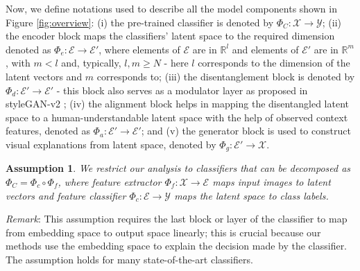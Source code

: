 \documentclass{article}
\newcommand{\ftcom}[2][]{\todo[author=FT, #1]{#2}}
\newtheorem{asu}{Assumption}
\begin{document}
Now, we define notations used to describe all the model components shown in Figure \ref{fig:overview}: (i) the pre-trained classifier is denoted by $\Phi_C: \mathcal{X} \rightarrow \mathcal{Y}$; (ii) the encoder block maps the classifiers' latent space to the required dimension\, denoted as $\Phi_e:\mathcal{E} \rightarrow \mathcal{E}'$, where elements of  $\mathcal{E}$ are in $\mathbb{R}^l$ and elements of $\mathcal{E}'$ are  in $\mathbb{R}^m$, with $m<l$  and, typically, $l,m \geq N$ - here $l$ corresponds to the dimension of the latent vectors and $m$ corresponds to; (iii) the disentanglement block is denoted by $\Phi_d: \mathcal{E}' \rightarrow \mathcal{E}'$ -  this block also serves as a modulator layer as proposed in styleGAN-v2 \cite{karras2020analyzing}; (iv) the alignment block helps in mapping the disentangled latent space to a human-understandable latent space with the help of observed context features, denoted as $\Phi_a: \mathcal{E}' \rightarrow \mathcal{E}'$; and (v) the generator block is used to construct visual explanations from latent space, denoted by $\Phi_g: \mathcal{E}' \rightarrow \mathcal{X}$.

\begin{asu} 
\label{assumption:classifier_decomposition}
We restrict %
our analysis %
to
classifiers that can be decomposed as $\Phi_C = \Phi_c \circ \Phi_f$, where feature extractor $\Phi_f:\mathcal{X} \rightarrow \mathcal{E}$ maps input images to latent vectors %
and feature classifier $\Phi_c:\mathcal{E} \rightarrow \mathcal{Y}$ maps the latent space to class labels.
\end{asu}

\textit{Remark}: This assumption requires the last block or layer of the classifier to map from embedding space to output space linearly; this is crucial because our methods use the embedding space to explain the decision made by the classifier. The assumption holds for many state-of-the-art classifiers.
\end{document}
